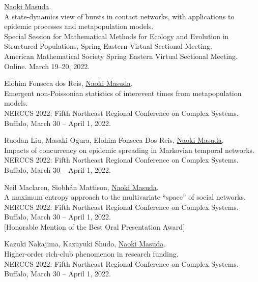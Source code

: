 \documentclass[11pt,letter]{article}
\begin{document}
\begin{etaremune}

\item \underline{Naoki Masuda}.\\
A state-dynamics view of bursts in contact networks, with applications to epidemic processes and metapopulation models.\\
Special Session for Mathematical Methods for Ecology and Evolution in Structured Populations, Spring Eastern Virtual Sectional Meeting.\\
American Mathematical Society Spring Eastern Virtual Sectional Meeting. Online. March 19--20, 2022.

\item Elohim Fonseca dos Reis, \underline{Naoki Masuda}.\\
Emergent non-Poissonian statistics of interevent times from metapopulation models.\\
NERCCS 2022: Fifth Northeast Regional Conference on Complex Systems.\\
Buffalo, March 30 -- April 1, 2022.

\item Ruodan Liu, Masaki Ogura, Elohim Fonseca Dos Reis, \underline{Naoki Masuda}.\\
Impacts of concurrency on epidemic spreading in Markovian temporal networks.\\
NERCCS 2022: Fifth Northeast Regional Conference on Complex Systems.\\
Buffalo, March 30 -- April 1, 2022.

\item Neil Maclaren, Siobh\'{a}n Mattison, \underline{Naoki Masuda}.\\
A maximum entropy approach to the multivariate ``space'' of social networks.\\
NERCCS 2022: Fifth Northeast Regional Conference on Complex Systems.\\
Buffalo, March 30 -- April 1, 2022.\\
$[$Honorable Mention of the Best Oral Presentation Award$]$

\item Kazuki Nakajima, Kazuyuki Shudo, \underline{Naoki Masuda}.\\
Higher-order rich-club phenomenon in research funding.\\
NERCCS 2022: Fifth Northeast Regional Conference on Complex Systems.\\
Buffalo, March 30 -- April 1, 2022.


\end{etaremune}
\end{document}
